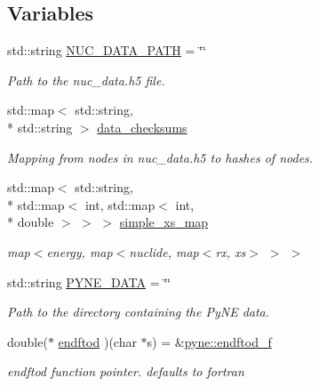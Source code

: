 \subsection*{Variables}
\begin{DoxyCompactItemize}
\item 
\hypertarget{namespacepyne_ac4b3b3dcf295d033b906bf921d820ae2}{std\+::string \hyperlink{namespacepyne_ac4b3b3dcf295d033b906bf921d820ae2}{N\+U\+C\+\_\+\+D\+A\+T\+A\+\_\+\+P\+A\+T\+H} = \char`\"{}\char`\"{}}\label{namespacepyne_ac4b3b3dcf295d033b906bf921d820ae2}

\begin{DoxyCompactList}\small\item\em Path to the nuc\+\_\+data.\+h5 file. \end{DoxyCompactList}\item 
std\+::map$<$ std\+::string, \\*
std\+::string $>$ \hyperlink{namespacepyne_a092bde815498a51a7532e3021a63ede5}{data\+\_\+checksums}
\begin{DoxyCompactList}\small\item\em Mapping from nodes in nuc\+\_\+data.\+h5 to hashes of nodes. \end{DoxyCompactList}\item 
\hypertarget{namespacepyne_a75b3d385906d5d2f078a6d099629a5c8}{std\+::map$<$ std\+::string, \\*
std\+::map$<$ int, std\+::map$<$ int, \\*
double $>$ $>$ $>$ \hyperlink{namespacepyne_a75b3d385906d5d2f078a6d099629a5c8}{simple\+\_\+xs\+\_\+map}}\label{namespacepyne_a75b3d385906d5d2f078a6d099629a5c8}

\begin{DoxyCompactList}\small\item\em map$<$energy, map$<$nuclide, map$<$rx, xs$>$ $>$ $>$ \end{DoxyCompactList}\item 
\hypertarget{namespacepyne_a7927bda45ba222dccef6e43a373b76a6}{std\+::string \hyperlink{namespacepyne_a7927bda45ba222dccef6e43a373b76a6}{P\+Y\+N\+E\+\_\+\+D\+A\+T\+A} = \char`\"{}\char`\"{}}\label{namespacepyne_a7927bda45ba222dccef6e43a373b76a6}

\begin{DoxyCompactList}\small\item\em Path to the directory containing the Py\+N\+E data. \end{DoxyCompactList}\item 
\hypertarget{namespacepyne_aa938a7defc049d691fa6d84aa2c1931e}{double($\ast$ \hyperlink{namespacepyne_aa938a7defc049d691fa6d84aa2c1931e}{endftod} )(char $\ast$s) = \&\hyperlink{namespacepyne_a14e300f1e589b42aaa451bc3cf4c70b8}{pyne\+::endftod\+\_\+f}}\label{namespacepyne_aa938a7defc049d691fa6d84aa2c1931e}

\begin{DoxyCompactList}\small\item\em endftod function pointer. defaults to fortran \end{DoxyCompactList}\end{DoxyCompactItemize}
